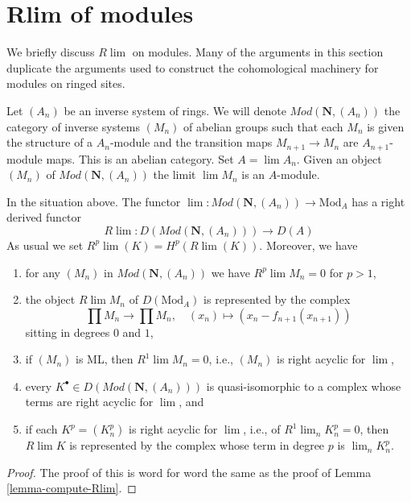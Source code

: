 \section{Rlim of modules}
\label{section-Rlim-modules}

\noindent
We briefly discuss $R\lim$ on modules. Many of the arguments in this
section duplicate the arguments used to construct the cohomological
machinery for modules on ringed sites.

\medskip\noindent
Let $(A_n)$ be an inverse system of rings. We will denote
$\textit{Mod}(\mathbf{N}, (A_n))$ the category of inverse systems
$(M_n)$ of abelian groups such that each $M_n$ is given the
structure of a $A_n$-module and the transition maps
$M_{n + 1} \to M_n$ are $A_{n + 1}$-module maps.
This is an abelian category. Set $A = \lim A_n$.
Given an object $(M_n)$ of $\textit{Mod}(\mathbf{N}, (A_n))$
the limit $\lim M_n$ is an $A$-module.

\begin{lemma}
\label{lemma-compute-Rlim-modules}
In the situation above. The functor
$\lim : \textit{Mod}(\mathbf{N}, (A_n)) \to \text{Mod}_A$
has a right derived functor
$$
R\lim :
D(\textit{Mod}(\mathbf{N}, (A_n)))
\longrightarrow
D(A)
$$
As usual we set $R^p\lim(K) = H^p(R\lim(K))$. Moreover, we have
\begin{enumerate}
\item for any $(M_n)$ in $\textit{Mod}(\mathbf{N}, (A_n))$ we have
$R^p\lim M_n = 0$ for $p > 1$,
\item the object $R\lim M_n$ of $D(\text{Mod}_A)$ is represented
by the complex
$$
\prod M_n \to \prod M_n,\quad
(x_n) \mapsto (x_n - f_{n + 1}(x_{n + 1}))
$$
sitting in degrees $0$ and $1$,
\item if $(M_n)$ is ML, then $R^1\lim M_n = 0$, i.e., $(M_n)$
is right acyclic for $\lim$,
\item every $K^\bullet \in D(\textit{Mod}(\mathbf{N}, (A_n)))$
is quasi-isomorphic to a complex whose terms are right acyclic for $\lim$, and
\item if each $K^p = (K^p_n)$ is right acyclic for $\lim$, i.e.,
of $R^1\lim_n K^p_n = 0$, then $R\lim K$ is represented by the
complex whose term in degree $p$ is $\lim_n K_n^p$.
\end{enumerate}
\end{lemma}

\begin{proof}
The proof of this is word for word the same as the proof of
Lemma \ref{lemma-compute-Rlim}.
\end{proof}

